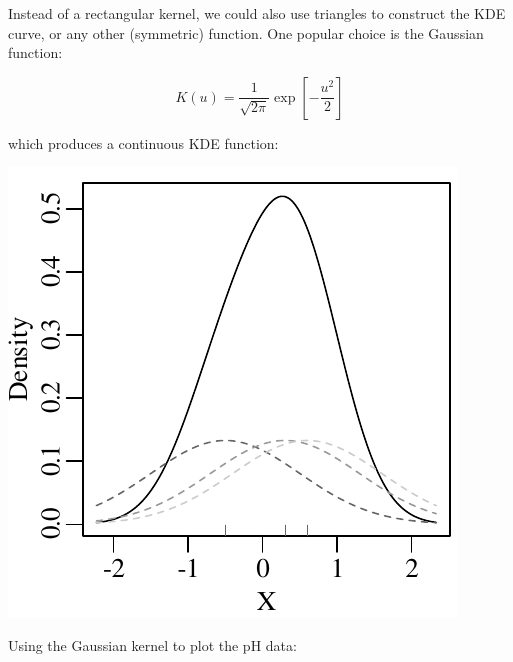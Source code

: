 Instead of a rectangular kernel, we could also use triangles to
construct the KDE curve, or any other (symmetric) function. One
popular choice is the Gaussian function:

\begin{equation}
  K(u) = \frac{1}{\sqrt{2\pi}}\exp\!\left[-\frac{u^2}{2}\right]
  \label{eq:gaussiankernel}
\end{equation}

\noindent which produces a continuous KDE function:\medskip

\noindent\begin{minipage}[t][][b]{.3\textwidth}
  \includegraphics[width=\textwidth]{../figures/gaussKDE.pdf}\medskip
\end{minipage}
\begin{minipage}[t][][t]{.7\textwidth}
\end{minipage}

Using the Gaussian kernel to plot the pH data:\medskip

